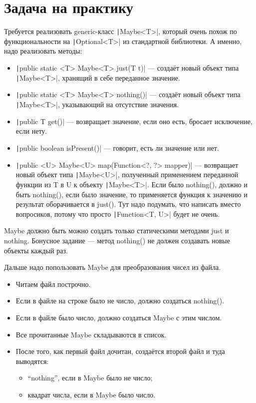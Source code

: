 \documentclass[a5paper]{article}
\begin{document}
\section{Задача на практику}

Требуется реализовать generic-класс \texttt|Maybe<T>|, который очень похож по функциональности на \texttt|Optional<T>| из стандартной библиотеки. А именно, надо реализовать методы:

\begin{itemize}
	\item \texttt|public static <T> Maybe<T> just(T t)| --- создаёт новый объект типа \texttt|Maybe<T>|, хранящий в себе переданное значение.
	\item \texttt|public static <T> Maybe<T> nothing()| --- создаёт новый объект типа \texttt|Maybe<T>|, указывающий на отсутствие значения.
	\item \texttt|public T get()| --- возвращает значение, если оно есть, бросает исключение, если нету.
	\item \texttt|public boolean isPresent()| --- говорит, есть ли значение или нет.
	\item \texttt|public <U> Maybe<U> map(Function<?, ?> mapper)| --- возвращает новый объект типа \texttt|Maybe<U>|, полученный применением переданной функции из T в U к объекту \texttt|Maybe<T>|. Если было nothing(), должно и быть nothing(), если было значение, то применяется функция к значению и результат оборачивается в just(). Тут надо подумать, что написать вместо вопросиков, потому что просто \texttt|Function<T, U>| будет не очень.
\end{itemize}

Maybe должно быть можно создать только статическими методами just и nothing. Бонусное задание --- метод nothing() не должен создавать новые объекты каждый раз.

Дальше надо попользовать Maybe для преобразования чисел из файла.

\begin{itemize}
	\item Читаем файл построчно.
	\item Если в файле на строке было не число, должно создаться nothing().
	\item Если в файле было число, должно создаться Maybe с этим числом.
	\item Все прочитанные Maybe складываются в список.
	\item После того, как первый файл дочитан, создаётся второй файл и туда выводятся:
	\begin{itemize}
		\item ``nothing'', если в Maybe было не число;
		\item квадрат числа, если в Maybe было число.
	\end{itemize}
\end{itemize}
\end{document}
